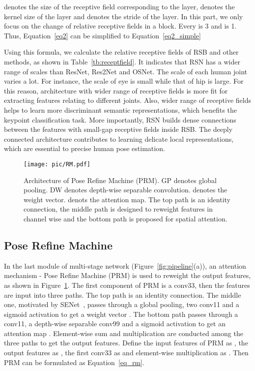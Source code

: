 \documentclass[runningheads]{llncs}
\begin{document}
 denotes the size of the receptive field corresponding to the  layer,  denotes the kernel size of the  layer and  denotes the stride of the  layer. In this part, we only focus on the change of relative receptive fields in a block. Every  is 3 and  is 1. Thus, Equation~\ref{eq2} can be simplified to Equation~\ref{eq2_simple}



Using this formula, we calculate the relative receptive fields of RSB and other methods, as shown in Table~\ref{tb:receptfield}. It indicates that RSN has a wider range of scales than ResNet, Res2Net and OSNet. 
The scale of each human joint varies a lot. For instance, the scale of eye is small while that of hip is large. For this reason, architecture with wider range of receptive fields is more fit for extracting features relating to different joints. Also, wider range of receptive fields helps to learn more discriminant semantic representations, which benefits the keypoint classification task.
More importantly, RSN builds dense connections between the features with small-gap receptive fields inside RSB. The deeply connected architecture contributes to learning delicate local representations, which are essential to precise human pose estimation.




\begin{figure}[h]
 \centering
\texttt{[image: pic/RM.pdf]} \caption{Architecture of Pose Refine Machine (PRM). GP denotes global pooling. DW denotes depth-wise separable convolution.  denotes the weight vector.  denots the attention map. The top path is an identity connection, the middle path is designed to reweight features in channel wise and the bottom path is proposed for spatial attention.} \label{fig:RB&FB} \end{figure}

\subsection{Pose Refine Machine} \label{sec:RM}
In the last module of multi-stage network (Figure~\ref{fig:pipeline}(a)), an attention mechanism - Pose Refine Machine (PRM) is used to reweight the output features, as shown in Figure~\ref{fig:RB&FB}. The first component of PRM is a conv33, then the features are input into three paths. The top path is an identity connection. The middle one, motivated by SENet~\cite{senet}, passes through a global pooling, two conv11 and a sigmoid activation to get a weight vector . The bottom path passes through a conv11, a depth-wise separable conv99 and a sigmoid activation to get an attention map . Element-wise sum and multiplication are conducted among the three paths to get the output features.
Define the input features of PRM as , the output features as , the first conv33 as  and element-wise multiplication as . Then  PRM can be formulated as Equation~\ref{eq_rm}.
\end{document}

